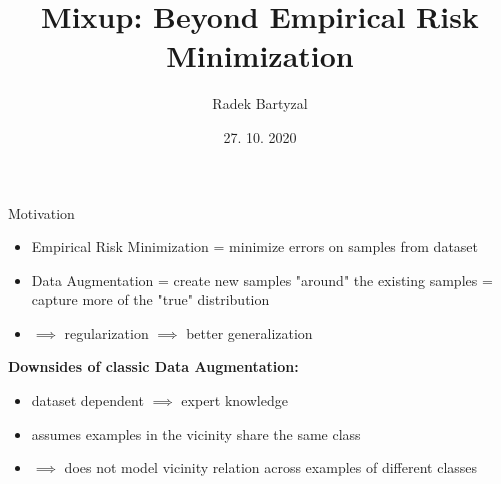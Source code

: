 \documentclass{beamer}
\begin{document}
\title[Mixup (2017)]{Mixup: Beyond Empirical Risk Minimization}  
\author{Radek Bartyzal}
\date{27. 10. 2020} 

\frame{\titlepage} 

\begin{frame}{Motivation}

\begin{itemize}
\item Empirical Risk Minimization = minimize errors on samples from dataset
\item Data Augmentation = create new samples "around" the existing samples = capture more of the "true" distribution 
\item $\implies$ regularization $\implies$ better generalization
\end{itemize}

\vfill

\textbf{Downsides of classic Data Augmentation:}
\begin{itemize}
\item dataset dependent $\implies$ expert knowledge
\item assumes examples in the vicinity share the same class
\item $\implies$ does not model vicinity relation across examples of different classes
\end{itemize}

\end{frame}
\end{document}
